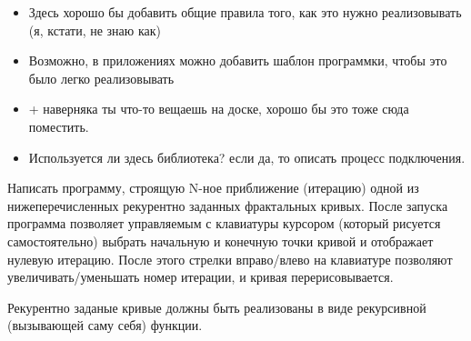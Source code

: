 
\def\zzfracdot#1{\fill (#1) circle (0.06cm); \fill[white] (#1) circle (0.03cm);}
\def\zzfracdots#1{\foreach \x in {#1} {\zzfracdot{\x}}}
\def\zzfracskip{\hskip0.1cm}

\newenvironment{zzfrac}[1]{
\begin{tikzpicture}[scale=1.2,
very thick/.style={line width=0.06cm},
thick/.style={line width=0.03cm}
]
\draw[thin] (-0.5,-0.5) rectangle (1.5,1.5);
\draw (0.5,-0.5) node[above] {#1};
}{
\end{tikzpicture}
}


\begin{itemize}
    \item Здесь хорошо бы добавить общие правила того, как это нужно реализовывать (я, кстати, не знаю как)
    \item Возможно, в приложениях можно добавить шаблон программки, чтобы это было легко реализовывать
    \item + наверняка ты что-то вещаешь на доске, хорошо бы это тоже сюда поместить.
    \item Используется ли здесь библиотека? если да, то описать процесс подключения. 
\end{itemize}
Написать программу, строящую N-ное приближение (итерацию) одной из 
нижеперечисленных рекурентно заданных фрактальных кривых. После запуска 
программа позволяет управляемым с клавиатуры курсором (который рисуется 
самостоятельно) выбрать начальную и конечную точки кривой и отображает нулевую 
итерацию. После этого стрелки вправо/влево на клавиатуре позволяют 
увеличивать/уменьшать номер итерации, и кривая перерисовывается.

Рекурентно заданые кривые должны быть реализованы в виде рекурсивной (вызывающей 
саму себя) функции.

